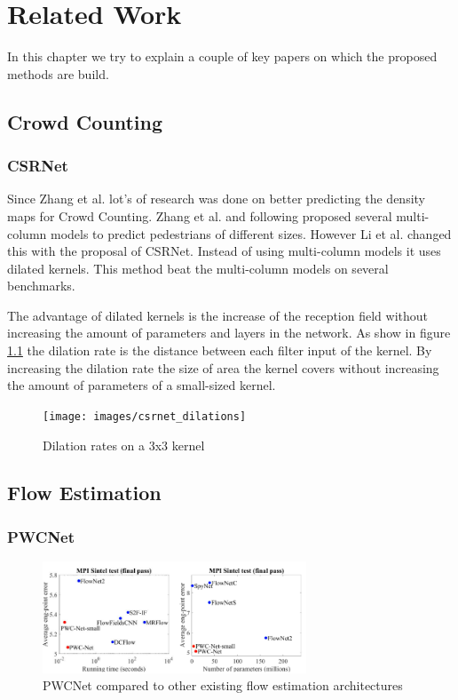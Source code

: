 \chapter{Related Work}
In this chapter we try to explain a couple of key papers on which the proposed methods are build.

\section{Crowd Counting}
\subsection{CSRNet}
Since Zhang et al. \cite{Zhang2016} lot's of research was done on better predicting the density maps for Crowd Counting. Zhang et al. and following proposed several multi-column models to predict pedestrians of different sizes. However Li et al. \cite{li2018csrnet} changed this with the proposal of CSRNet. Instead of using multi-column models it uses dilated kernels. This method beat the multi-column models on several benchmarks.

The advantage of dilated kernels is the increase of the reception field without increasing the amount of parameters and layers in the network. As show in figure \ref{fig:csrnet_dilation} the dilation rate is the distance between each filter input of the kernel. By increasing the dilation rate the size of area the kernel covers without increasing the amount of parameters of a small-sized kernel.
\begin{figure}[h]
\centering
\texttt{[image: images/csrnet\_dilations]}
\caption{Dilation rates on a 3x3 kernel}
\label{fig:csrnet_dilation}
\end{figure}


\section{Flow Estimation}

\subsection{PWCNet}

\begin{figure}[h]
\centering
\includegraphics[width=0.7\textwidth]{images/pwcnet_improvements}
\caption{PWCNet compared to other existing flow estimation architectures}
\label{fig:pwc_compare}
\end{figure}

